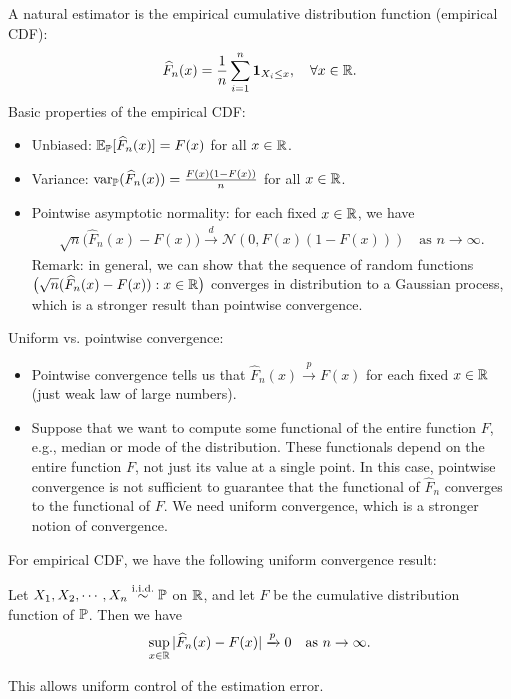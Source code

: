 \documentclass[11pt,letterpaper]{article}
\numberwithin{assumption}{lecture}
\numberwithin{theorem}{lecture}
\numberwithin{proposition}{lecture}
\numberwithin{lemma}{lecture}
\numberwithin{claim}{lecture}
\numberwithin{corollary}{lecture}
\numberwithin{definition}{lecture}
\numberwithin{conjecture}{lecture}
\numberwithin{remark}{lecture}
\numberwithin{example}{lecture}
\numberwithin{equation}{lecture}
\begin{document}
A natural estimator is the empirical cumulative distribution function (empirical CDF):
\begin{align*}
  \widehat{F}_n(x) = \frac{1}{n} \sum_{i=1}^n \bm{1}_{X_i \leq x}, \quad \forall x \in \mathbb{R}.
\end{align*}
Basic properties of the empirical CDF:
\begin{itemize}
  \item Unbiased: ${\mathbb{E}}_{{\mathbb{P}}}[\widehat{F}_n(x)] = F(x)$ for all $x \in \mathbb{R}$.
  \item Variance: $\operatorname{var}_{{\mathbb{P}}}(\widehat{F}_n(x)) = \frac{F(x)(1 - F(x))}{n}$ for all $x \in \mathbb{R}$.
  \item Pointwise asymptotic normality: for each fixed $x \in \mathbb{R}$, we have
  \begin{align*}
    \sqrt{n} \big( \widehat{F}_n(x) - F(x) \big) \xrightarrow{d}\mathcal{N}(0, F(x)(1 - F(x))) \quad \text{as } n \to \infty.
  \end{align*}
  Remark: in general, we can show that the sequence of random functions $\big(\sqrt{n} (\widehat{F}_n (x) - F (x)) : x \in \mathbb{R} \big)$ converges in distribution to a Gaussian process, which is a stronger result than pointwise convergence.
\end{itemize}
Uniform vs. pointwise convergence:
\begin{itemize}
\item Pointwise convergence tells us that $\widehat{F}_n (x) \xrightarrow{p} F(x)$ for each fixed $x \in \mathbb{R}$ (just weak law of large numbers).
\item Suppose that we want to compute some functional of the entire function $F$, e.g., median or mode of the distribution. These functionals depend on the entire function $F$, not just its value at a single point. In this case, pointwise convergence is not sufficient to guarantee that the functional of $\widehat{F}_n$ converges to the functional of $F$. We need uniform convergence, which is a stronger notion of convergence.
\end{itemize}
For empirical CDF, we have the following uniform convergence result:
\begin{theorem}
  Let $X_1, X_2, \cdots, X_n \overset{\mathrm{i.i.d.}}{\sim} {\mathbb{P}}$ on $\mathbb{R}$, and let $F$ be the cumulative distribution function of ${\mathbb{P}}$. Then we have
  \begin{align*}
    \sup_{x \in \mathbb{R}} |\widehat{F}_n(x) - F(x)| \xrightarrow{p} 0 \quad \text{as } n \to \infty.
  \end{align*}
\end{theorem}
This allows uniform control of the estimation error.
\end{document}
